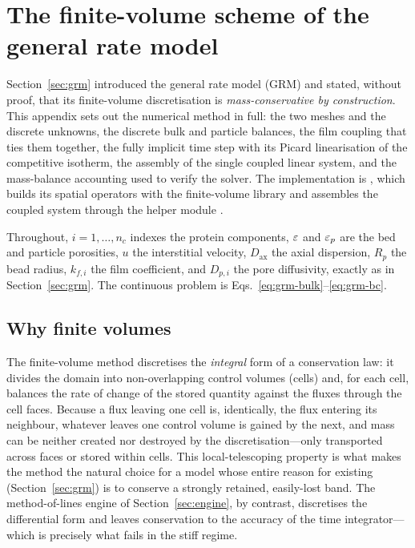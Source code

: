 \chapter{The finite-volume scheme of the general rate model}
\label{app:grm}

Section~\ref{sec:grm} introduced the general rate model (GRM) and stated, without
proof, that its finite-volume discretisation is \emph{mass-conservative by
construction}. This appendix sets out the numerical method in full: the two
meshes and the discrete unknowns, the discrete bulk and particle balances, the
film coupling that ties them together, the fully implicit time step with its
Picard linearisation of the competitive isotherm, the assembly of the single
coupled linear system, and the mass-balance accounting used to verify the solver.
The implementation is , which builds its
spatial operators with the  finite-volume library and assembles the
coupled system through the helper module .

Throughout, $i=1,\dots,n_c$ indexes the protein components, $\varepsilon$ and $\varepsilon_p$ are
the bed and particle porosities, $u$ the interstitial velocity, $D_{\mathrm{ax}}$
the axial dispersion, $R_p$ the bead radius, $k_{f,i}$ the film coefficient, and
$D_{p,i}$ the pore diffusivity, exactly as in Section~\ref{sec:grm}. The continuous
problem is Eqs.~\eqref{eq:grm-bulk}--\eqref{eq:grm-bc}.

\section{Why finite volumes}
\label{app:grm-why}

The finite-volume method discretises the \emph{integral} form of a conservation
law: it divides the domain into non-overlapping control volumes (cells) and, for
each cell, balances the rate of change of the stored quantity against the fluxes
through the cell faces. Because a flux leaving one cell is, identically, the flux
entering its neighbour, whatever leaves one control volume is gained by the next,
and mass can be neither created nor destroyed by the discretisation---only
transported across faces or stored within cells. This local-telescoping property
is what makes the method the natural choice for a model whose entire reason for
existing (Section~\ref{sec:grm}) is to conserve a strongly retained, easily-lost
band. The method-of-lines engine of Section~\ref{sec:engine}, by contrast,
discretises the differential form and leaves conservation to the accuracy of the
time integrator---which is precisely what fails in the stiff regime.

